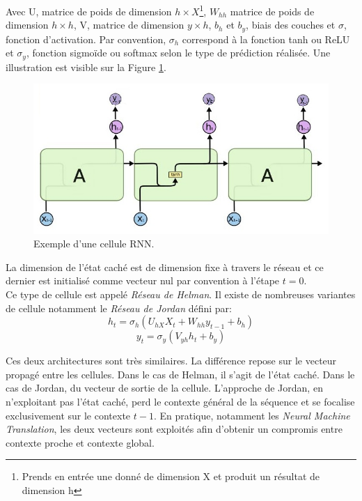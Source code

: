 \noindent Avec U, matrice de poids de dimension $h \times X$\footnote{Prends en entrée une donné de dimension X et produit un résultat de dimension h}, $W_{hh}$ matrice de poids de dimension $h \times h$, V, matrice de dimension $y \times h$, $b_h$ et $b_y$, biais des couches et $\sigma$, fonction d'activation. Par convention, $\sigma_h$ correspond à la fonction tanh ou ReLU et $\sigma_y$, fonction sigmoïde ou softmax selon le type de prédiction réalisée. Une illustration est visible sur la Figure \ref{RNNdetails}.\\

\begin{figure}[h]
    \centering
    \includegraphics[scale=0.5]{./tex/recurrent-neural-network/rnndetail.jpg}
    \caption{Exemple d'une cellule RNN.}
    \label{RNNdetails}
\end{figure}

\noindent La dimension de l'état caché est de dimension fixe à travers le réseau et ce dernier est initialisé comme vecteur nul par convention à l'étape $t=0$.\\

\noindent Ce type de cellule est appelé \textit{Réseau de Helman}. Il existe de nombreuses variantes de cellule notamment le \textit{Réseau de Jordan} défini par:
$$h_t = \sigma_h(U_{hX}X_t + W_{hh} y_{t-1} + b_h)$$
$$y_t = \sigma_y(V_{yh}h_t + b_y)$$

\noindent Ces deux architectures sont très similaires. La différence repose sur le vecteur propagé entre les cellules. Dans le cas de Helman, il s'agit de l'état caché. Dans le cas de Jordan, du vecteur de sortie de la cellule. L'approche de Jordan, en n'exploitant pas l'état caché, perd le contexte général de la séquence et se focalise exclusivement sur le contexte $t-1$. En pratique, notamment les \textit{Neural Machine Translation}, les deux vecteurs sont exploités afin d'obtenir un compromis entre contexte proche et contexte global. \\

